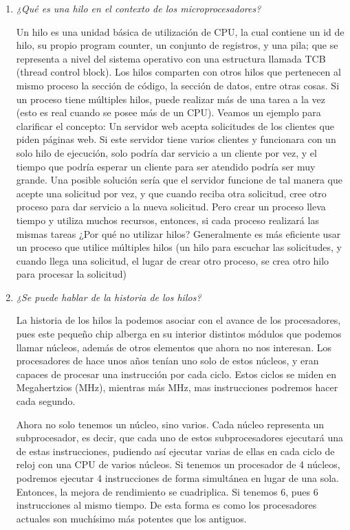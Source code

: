 \documentclass[a4paper,12pt]{article}
\begin{document}
\begin{enumerate}

\item {\it  ¿Qué es una hilo en el contexto de los microprocesadores?}

Un hilo es una unidad básica de utilización de CPU, la cual contiene un id de hilo, su
propio program counter, un conjunto de registros, y una pila; que se representa a nivel
del sistema operativo con una estructura llamada TCB (thread control block).
Los hilos comparten con otros hilos que pertenecen al mismo proceso la sección de
código, la sección de datos, entre otras cosas. Si un proceso tiene múltiples hilos, puede
realizar más de una tarea a la vez (esto es real cuando se posee más de un CPU).
Veamos un ejemplo para clarificar el concepto:
Un servidor web acepta solicitudes de los clientes que piden páginas web. Si este
servidor tiene varios clientes y funcionara con un solo hilo de ejecución, solo podría dar
servicio a un cliente por vez, y el tiempo que podría esperar un cliente para ser atendido
podría ser muy grande.
Una posible solución sería que el servidor funcione de tal manera que acepte una
solicitud por vez, y que cuando reciba otra solicitud, cree otro proceso para dar servicio
a la nueva solicitud. Pero crear un proceso lleva tiempo y utiliza muchos recursos,
entonces, si cada proceso realizará las mismas tareas ¿Por qué no utilizar hilos?
Generalmente es más eficiente usar un proceso que utilice múltiples hilos (un hilo para
escuchar las solicitudes, y cuando llega una solicitud, el lugar de crear otro proceso, se
crea otro hilo para procesar la solicitud)


\item {\it  ¿Se puede hablar de la historia de los hilos?}

La historia de los hilos la podemos asociar con el avance de los procesadores, pues este pequeño chip alberga en su interior distintos módulos que podemos llamar núcleos, además de otros elementos que ahora no nos interesan. Los procesadores de hace unos años tenían uno solo de estos núcleos, y eran capaces de procesar una instrucción por cada ciclo. Estos ciclos se miden en Megahertzios (MHz), mientras más MHz, mas instrucciones podremos hacer cada segundo.

Ahora no solo tenemos un núcleo, sino varios. Cada núcleo representa un subprocesador, es decir, que cada uno de estos subprocesadores ejecutará una de estas instrucciones, pudiendo así ejecutar varias de ellas en cada ciclo de reloj con una CPU de varios núcleos. Si tenemos un procesador de 4 núcleos, podremos ejecutar 4 instrucciones de forma simultánea en lugar de una sola. Entonces, la mejora de rendimiento se cuadriplica. Si tenemos 6, pues 6 instrucciones al mismo tiempo. De esta forma es como los procesadores actuales son muchísimo más potentes que los antiguos.





\end{enumerate}
\end{document}
